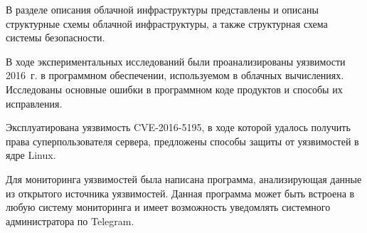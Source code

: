 В разделе описания облачной инфраструктуры представлены и описаны структурные схемы облачной инфраструктуры, а также структурная схема системы безопасности.

В ходе экспериментальных исследований были проанализированы уязвимости 2016~г. в программном обеспечении, используемом в облачных вычислениях.
Исследованы основные ошибки в программном коде продуктов и способы их исправления.

Эксплуатирована уязвимость CVE-2016-5195, в ходе которой удалось получить права суперпользователя сервера, предложены способы защиты от уязвимостей в ядре Linux.

Для мониторинга уязвимостей была написана программа, анализирующая данные из открытого источника уязвимостей.
Данная программа может быть встроена в любую систему мониторинга и имеет возможность уведомлять системного администратора по Telegram.

\clearpage
